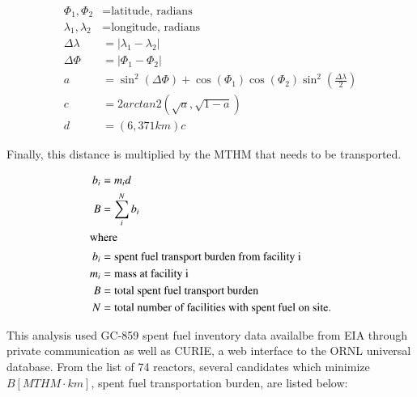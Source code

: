  \begin{align} 
         \Phi_1,\Phi_2&= \mbox{latitude, radians}\\
         \lambda_1,\lambda_2 &= \mbox{longitude, radians}\\
         \Delta\lambda &= \left|\lambda_1 - \lambda_2\right|\\
         \Delta\Phi &= \left|\Phi_1 - \Phi_2\right|\\
         a&=\sin^2(\Delta\Phi)+\cos(\Phi_1)\cos(\Phi_2)\sin^2{\left(\frac{\Delta\lambda}{2}\right)}\\
         c &= 2arctan2(\sqrt{a},\sqrt{1-a})\\
         d &=  (6,371km)c
 \end{align}


Finally, this distance is multiplied by the \gls{MTHM} that needs to be transported.


\begin{align}
        b_i &= m_id\\
        B &= \sum_i^N b_i\\
        \intertext{where}
        b_i &= \mbox{spent fuel transport burden from facility i}\\
        m_i &= \mbox{mass at facility i}\\
        B &= \mbox{total spent fuel transport burden}\\
        N &= \mbox{total number of facilities with spent fuel on site.}
\end{align}

This analysis used GC-859 spent fuel inventory data availalbe from \gls{EIA} 
through private communication \cite{domenico_GC-859_2016} as well as \gls{CURIE}, a web interface to 
the \gls{ORNL} universal database\cite{ornl_centralized_2016}.
From the list of 74 reactors, several candidates which minimize $B [MTHM\cdot 
km]$, spent fuel transportation burden, are listed below:
    
\begin{table}[h]
\centering

        \caption { Reactors with relatively small spent fuel transportation burden $ [MTHM\cdot km]$.}
\end {table}


